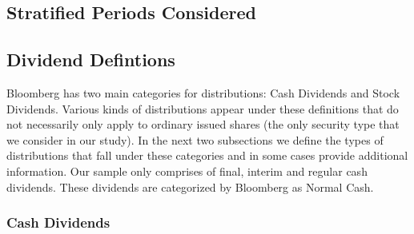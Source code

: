 \documentclass[12pt,preprint, authoryear]{elsarticle}
\numberwithin{equation}{section}
\numberwithin{figure}{section}
\numberwithin{table}{section}
\begin{document}
\hypertarget{stratified-periods-considered}{%
\subsection{Stratified Periods
Considered}\label{stratified-periods-considered}}

\newpage

\hypertarget{dividend-defintions}{%
\subsection{Dividend Defintions}\label{dividend-defintions}}

Bloomberg has two main categories for distributions: Cash Dividends and
Stock Dividends. Various kinds of distributions appear under these
definitions that do not necessarily only apply to ordinary issued shares
(the only security type that we consider in our study). In the next two
subsections we define the types of distributions that fall under these
categories and in some cases provide additional information. Our sample
only comprises of final, interim and regular cash dividends. These
dividends are categorized by Bloomberg as Normal Cash.

\hypertarget{cash-dividends}{%
\subsubsection{Cash Dividends}\label{cash-dividends}}
\end{document}
